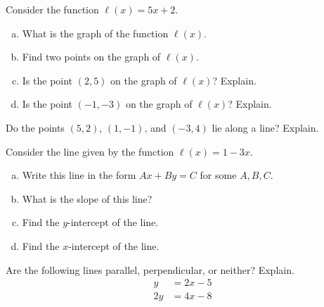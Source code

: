 \documentclass[11pt,letterpaper]{article}
\begin{document}


 Consider the function $\ell(x)= 5x + 2$.

\begin{enumerate}[(a)]
\item What is the graph of the function $\ell(x)$.
\item Find two points on the graph of $\ell(x)$.
\item Is the point $(2, 5)$ on the graph of $\ell(x)$? Explain. 
\item Is the point $(-1, -3)$ on the graph of $\ell(x)$? Explain. 
\end{enumerate}





\newpage





 Do the points $(5, 2)$, $(1, -1)$, and $(-3, 4)$ lie along a line? Explain.





\newpage





 Consider the line given by the function $\ell(x)= 1 - 3x$.

\begin{enumerate}[(a)]
\item Write this line in the form $Ax + By= C$ for some $A, B, C$. 
\item What is the slope of this line?
\item Find the $y$-intercept of the line.
\item Find the $x$-intercept of the line. 
\end{enumerate}





\newpage





 Are the following lines parallel, perpendicular, or neither? Explain.
	\[
	\begin{aligned}
	y&= 2x - 5 \\
	2y&= 4x - 8
	\end{aligned}
	\]
\end{document}
